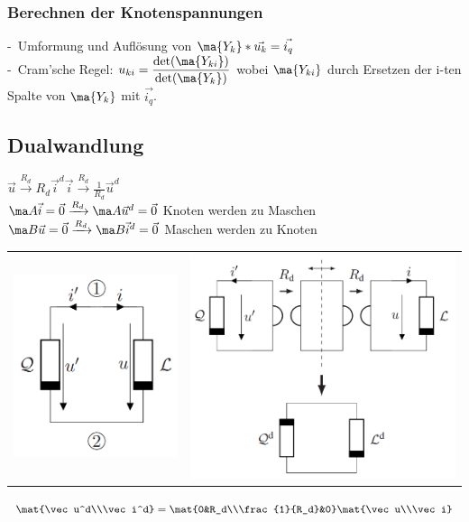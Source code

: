 \documentclass[fs, footer]{latex4ei}
\begin{document}
\begin{multicols*}{4}
    \subsubsection{Berechnen der Knotenspannungen}
    -\ Umformung und Auflösung von $\ma {Y_k} * \vec{u_k} = \vec{i_q}$\\
    -\ Cram'sche Regel: $u_{ki} = \frac{\det(\ma {Y_{ki}})}{\det(\ma{Y_k})}$ wobei $\ma {Y_{ki}}$ durch Ersetzen der i-ten Spalte von $\ma {Y_k}$ mit $\vec{i_q}$.\\

    \subsection{Dualwandlung}
    $\vec u \xrightarrow{R_d} R_d\vec i^d$\qquad$\vec i \xrightarrow{R_d} \frac{1}{R_d}\vec u^d$\\
    $\ma A\vec i = \vec 0 \xrightarrow{R_d} \ma A\vec u^d = \vec 0$ Knoten werden zu Maschen\\
    $\ma B\vec u = \vec 0 \xrightarrow{R_d} \ma B\vec i^d = \vec 0$ Maschen werden zu Knoten\\
    \begin{tabular}{cc}
        \includegraphics[width=.295\columnwidth]{img/dual_start} &
        \includegraphics[width=.595\columnwidth]{img/dual_end}
    \end{tabular}
    $\mat{\vec u^d\\\vec i^d}=\mat{0&R_d\\\frac{1}{R_d}&0}\mat{\vec u\\\vec i}$


\end{multicols*}
\end{document}
